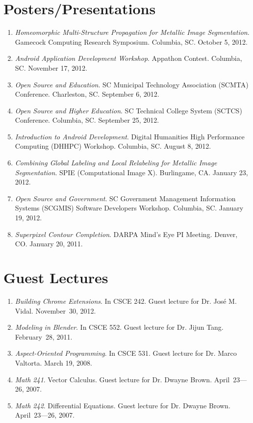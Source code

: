 \documentclass[a4paper,10pt]{article}
\begin{document}
\section{Posters/Presentations}
\begin{enumerate}
\renewcommand{\labelenumi}{[P\arabic{enumi}] }
\item \emph{Homeomorphic Multi-Structure Propagation for Metallic
  Image Segmentation}.  Gamecock Computing Research Symposium.
  Columbia, SC.  October 5, 2012.
\item \emph{Android Application Development Workshop}.  Appathon
  Contest.  Columbia, SC.  November 17, 2012.
\item \emph{Open Source and Education}. SC Municipal Technology
  Association (SCMTA) Conference. Charleston, SC.  September 6, 2012.
\item \emph{Open Source and Higher Education}.  SC Technical College
  System (SCTCS) Conference.  Columbia, SC.  September 25, 2012.
\item \emph{Introduction to Android Development}.  Digital Humanities
  High Performance Computing (DHHPC) Workshop.  Columbia, SC.  August
  8, 2012.
\item \emph{Combining Global Labeling and Local Relabeling for
  Metallic Image Segmentation}.  SPIE (Computational Image X).
  Burlingame, CA.  January 23, 2012.
\item \emph{Open Source and Government}.  SC Government Management
  Information Systems (SCGMIS) Software Developers Workshop.
  Columbia, SC.  January 19, 2012.
\item \emph{Superpixel Contour Completion}.  DARPA Mind's Eye PI
  Meeting.  Denver, CO.  January 20, 2011.
\end{enumerate}

\section{Guest Lectures}
\begin{enumerate}
\renewcommand{\labelenumi}{[G\arabic{enumi}] }
\item \emph{Building Chrome Extensions}.  In CSCE 242.  Guest lecture for Dr. José M. Vidal.  November~30, 2012.
\item \emph{Modeling in Blender}.  In CSCE 552.  Guest lecture for Dr. Jijun Tang.  February~28, 2011.
\item \emph{Aspect-Oriented Programming}. In CSCE 531. Guest lecture for Dr. Marco Valtorta. March 19, 2008.
\item \emph{Math 241}. Vector Calculus. Guest lecture for Dr. Dwayne Brown. April~23---26, 2007. 
\item \emph{Math 242}. Differential Equations. Guest lecture for Dr. Dwayne Brown. April~23---26, 2007. 
\end{enumerate}
\end{document}
